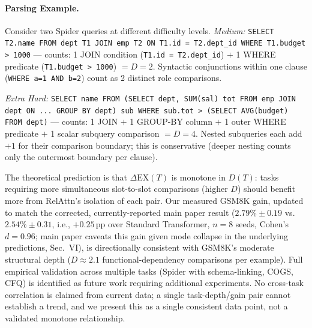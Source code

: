 \documentclass[conference]{IEEEtran}
\begin{document}

\paragraph{Parsing Example.}
Consider two Spider queries at different difficulty levels.
\emph{Medium:} {\small\texttt{SELECT T2.name FROM dept T1 JOIN emp T2
		ON T1.id = T2.dept\_id WHERE T1.budget > 1000}}
--- counts: 1 JOIN condition (\texttt{T1.id = T2.dept\_id}) $+$ 1
WHERE predicate (\texttt{T1.budget > 1000}) $= D = 2$.
Syntactic conjunctions within one clause (\texttt{WHERE a=1 AND b=2})
count as 2 distinct role comparisons.

\emph{Extra Hard:} {\small\texttt{SELECT name FROM (SELECT dept, SUM(sal)
		tot FROM emp JOIN dept ON ... GROUP BY dept) sub WHERE sub.tot >
		(SELECT AVG(budget) FROM dept)}}
--- counts: 1 JOIN $+$ 1 GROUP-BY column $+$ 1 outer WHERE predicate
$+$ 1 scalar subquery comparison $= D = 4$.
Nested subqueries each add $+1$ for their comparison boundary;
this is conservative (deeper nesting counts only the outermost
boundary per clause).

The theoretical prediction is that $\Delta\mathrm{EX}(T)$ is monotone in $D(T)$: tasks requiring more simultaneous slot-to-slot comparisons (higher $D$) should benefit more from RelAttn's isolation of each pair. Our measured GSM8K gain, updated to match the corrected, currently-reported main paper result ($2.79\%\pm0.19$ vs.\ $2.54\%\pm0.31$, i.e., $+0.25$\,pp over Standard Transformer, $n{=}8$ seeds, Cohen's $d{=}0.96$; main paper caveats this gain given mode collapse in the underlying predictions, Sec.~VI), is directionally consistent with GSM8K's moderate structural depth ($D \approx 2.1$ functional-dependency comparisons per example). Full empirical validation across multiple tasks (Spider with schema-linking, COGS, CFQ) is identified as future work requiring additional experiments. No cross-task correlation is claimed from current data; a single task-depth/gain pair cannot establish a trend, and we present this as a single consistent data point, not a validated monotone relationship.
\end{document}
